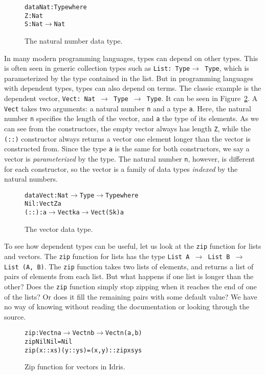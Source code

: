 \begin{figure}
\begin{alltt}
data Nat : Type where
  Z : Nat
  S : Nat \(\to\) Nat
\end{alltt}
\caption{The natural number data type.}
\label{fig:nat}
\end{figure}

In many modern programming languages, types can depend on other types. This is often seen in generic collection types such as \texttt{List:~Type\(\to\) Type}, which is parameterized by the type contained in the list. But in programming languages with dependent types, types can also depend on terms. The classic example is the dependent vector, \texttt{Vect:~Nat~\(\to\) Type~\(\to\) Type}. It can be seen in Figure~\ref{fig:vect}. A \texttt{Vect} takes two arguments: a natural number \texttt{n} and a type \texttt{a}. Here, the natural number \texttt{n} specifies the length of the vector, and \texttt{a} the type of its elements. As we can see from the constructors, the empty vector always has length \texttt{Z}, while the \texttt{(::)} constructor always returns a vector one element longer than the vector is constructed from. Since the type \texttt{a} is the same for both constructors, we say a vector is \emph{parameterized} by the type. The natural number \texttt{n}, however, is different for each constructor, so the vector is a family of data types \emph{indexed} by the natural numbers.

\begin{figure}
\begin{alltt}
data Vect : Nat \(\to\) Type \(\to\) Type where
  Nil  : Vect Z a
  (::) : a \(\to\) Vect k a \(\to\) Vect (S k) a
\end{alltt}
\caption{The vector data type.}
\label{fig:vect}
\end{figure}

To see how dependent types can be useful, let us look at the \texttt{zip} function for lists and vectors. The \texttt{zip} function for lists has the type \texttt{List~A~$\to$ List~B~$\to$ List~(A,~B)}. The \texttt{zip} function takes two lists of elements, and returns a list of pairs of elements from each list. But what happens if one list is longer than the other? Does the \texttt{zip} function simply stop zipping when it reaches the end of one of the lists? Or does it fill the remaining pairs with some default value? We have no way of knowing without reading the documentation or looking through the source.

\begin{figure}
\begin{alltt}
zip : Vect n a \(\to\) Vect n b \(\to\) Vect n (a, b)
zip Nil       Nil       = Nil
zip (x :: xs) (y :: ys) = (x, y) :: zip xs ys
\end{alltt}
\caption{Zip function for vectors in Idris.}
\label{fig:zip}
\end{figure}


